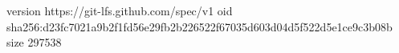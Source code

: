 version https://git-lfs.github.com/spec/v1
oid sha256:d23fc7021a9b2f1fd56e29fb2b226522f67035d603d04d5f522d5e1ce9c3b08b
size 297538
